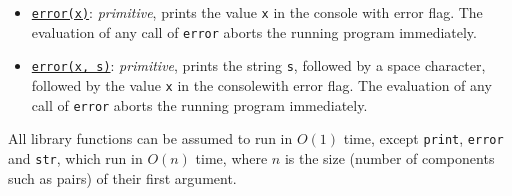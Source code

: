 \begin{itemize}
    console; returns \texttt{None}.
  \item
    \href{https://sourceacademy.org/sicpjs/1.2.6\#footnote-7}{\texttt{error(x)}}:
    \textit{primitive}, prints the value \texttt{x} in the
    console with error flag. The evaluation of any call of
    \texttt{error} aborts the running program immediately.
  \item
    \href{https://sourceacademy.org/sicpjs/2.1.3\#footnote-2}{\texttt{error(x,
    s)}}: \textit{primitive}, prints the string \texttt{s},
    followed by a space character, followed by the value \texttt{x}
    in the console\footnotemark[\value{footnote}] with error flag.
    The evaluation
    of any call of \texttt{error} aborts the running program immediately.
\end{itemize}
All library functions can be assumed to run
in $O(1)$ time, except \texttt{print}, \texttt{error} and \texttt{str},
which run in $O(n)$ time, where $n$ is
the size (number of components such as pairs) of their first argument.
